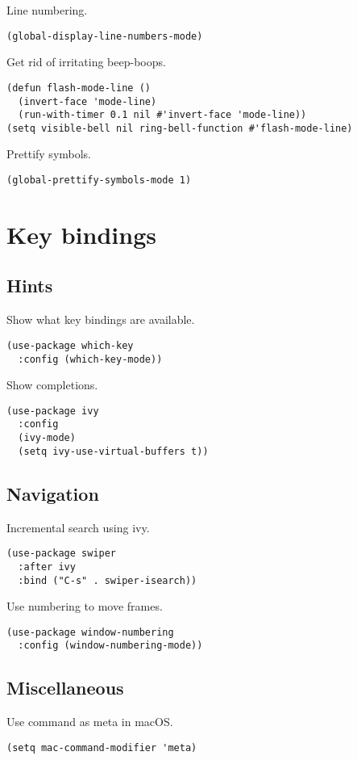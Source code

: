 \documentclass[a4paper,11pt]{article}
\begin{document}
Line numbering.
\begin{verbatim}
(global-display-line-numbers-mode)
\end{verbatim}

Get rid of irritating beep-boops.
\begin{verbatim}
(defun flash-mode-line ()
  (invert-face 'mode-line)
  (run-with-timer 0.1 nil #'invert-face 'mode-line))
(setq visible-bell nil ring-bell-function #'flash-mode-line)
\end{verbatim}

Prettify symbols.
\begin{verbatim}
(global-prettify-symbols-mode 1)
\end{verbatim}

\section{Key bindings}
\label{sec:orgcd5f71e}
\subsection{Hints}
\label{sec:orgd9067d8}
Show what key bindings are available.
\begin{verbatim}
(use-package which-key
  :config (which-key-mode))
\end{verbatim}

Show completions.
\begin{verbatim}
(use-package ivy
  :config
  (ivy-mode)
  (setq ivy-use-virtual-buffers t))
\end{verbatim}

\subsection{Navigation}
\label{sec:orgbb582a4}
Incremental search using ivy.
\begin{verbatim}
(use-package swiper
  :after ivy
  :bind ("C-s" . swiper-isearch))
\end{verbatim}

Use numbering to move frames.
\begin{verbatim}
(use-package window-numbering
  :config (window-numbering-mode))
\end{verbatim}

\subsection{Miscellaneous}
\label{sec:org086af3c}
Use command as meta in macOS.
\begin{verbatim}
(setq mac-command-modifier 'meta)
\end{verbatim}
\end{document}
